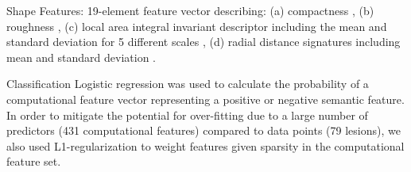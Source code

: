 Shape Features: 19-element feature vector describing: (a) compactness  \cite{Duda:1973ul}, (b) roughness \cite{Kilday:1993jk}, (c) local area integral invariant descriptor including the mean and standard deviation for 5 different scales \cite{Hong:2006fl, Manay:2006cg}, (d) radial distance signatures including mean and standard deviation \cite{MRangayyan:2005td}.  


Classification
Logistic regression was used to calculate the probability of a computational feature vector representing a positive or negative semantic feature. In order to mitigate the potential for over-fitting due to a large number of predictors (431 computational features) compared to data points (79 lesions), we also used L1-regularization \cite{Tibshirani:1996wb} to weight features given sparsity in the computational feature set.
